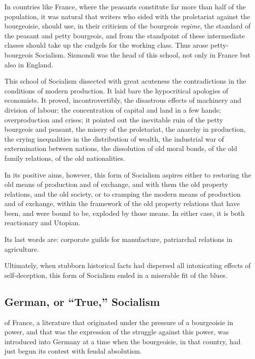 In countries like France, where the peasants constitute far more than
half of the population, it was natural that writers who sided with the
proletariat against the bourgeoisie, should use, in their criticism of
the bourgeois \textit{regime}, the standard of the peasant and petty
bourgeois, and from the standpoint of these intermediate classes should
take up the cudgels for the working class. Thus arose petty-bourgeois
Socialism. Sismondi was the head of this school, not only in France but
also in England.

This school of Socialism dissected with great acuteness the
contradictions in the conditions of modern production. It laid bare the
hypocritical apologies of economists. It proved, incontrovertibly, the
disastrous effects of machinery and division of labour; the
concentration of capital and land in a few hands; overproduction and
crises; it pointed out the inevitable ruin of the petty bourgeois and
peasant, the misery of the proletariat, the anarchy in production, the
crying inequalities in the distribution of wealth, the industrial war
of extermination between nations, the dissolution of old moral bonds,
of the old family relations, of the old nationalities.

In its positive aims, however, this form of Socialism aspires either to
restoring the old means of production and of exchange, and with them
the old property relations, and the old society, or to cramping the
modern means of production and of exchange, within the framework of the
old property relations that have been, and were bound to be, exploded
by those means. In either case, it is both reactionary and Utopian.

Its last words are: corporate guilds for manufacture, patriarchal
relations in agriculture.

Ultimately, when stubborn historical facts had dispersed all
intoxicating effects of self-deception, this form of Socialism ended in
a miserable fit of the blues.

\subsection*{German, or ``True,'' Socialism}
 of France, a literature that
originated under the pressure of a bourgeoisie in power, and that was
the expression of the struggle against this power, was introduced into
Germany at a time when the bourgeoisie, in that country, had just begun
its contest with feudal absolutism.

